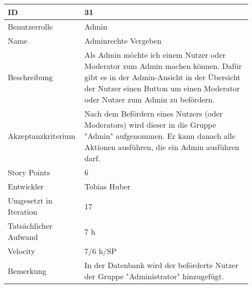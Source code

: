 \begin{tabularx}{\textwidth}{|p{}|X|}
	\hline
	ID & 31 \\
	\hline
	Benutzerrolle & Admin \\
	\hline
	Name & Adminrechte Vergeben\\
	\hline
	Beschreibung & Als Admin möchte ich einem Nutzer oder Moderator zum Admin machen können. Dafür gibt es in der Admin-Ansicht in der Übersicht der Nutzer einen Button um einen Moderator oder Nutzer zum Admin zu befördern.  \\
	\hline
	Akzeptanzkriterium & Nach dem Befördern eines Nutzers (oder Moderators) wird dieser in die Gruppe "Admin" aufgenommen. Er kann danach alle Aktionen ausführen, die ein Admin ausführen darf. \\
	\hline
	Story Points & 6 \\
	\hline
	Entwickler &  Tobias Huber\\
	\hline
	Umgesetzt in Iteration & 17\\
	\hline
	Tatsächlicher Aufwand & 7 h\\
	\hline
	Velocity & 7/6 h/SP\\
	\hline
	Bemerkung & In der Datenbank wird der beförderte Nutzer der Gruppe "Administrator" hinzugefügt. \\
	\hline
\end{tabularx}
\vspace{20pt}
